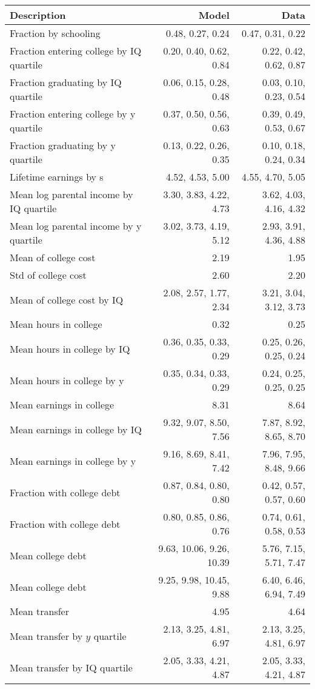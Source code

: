 \begin{tabular}{lrr}
\hline
Description & Model  & Data  \\
\hline
Fraction by schooling & 0.48, 0.27, 0.24  & 0.47, 0.31, 0.22  \\
Fraction entering college by IQ quartile & 0.20, 0.40, 0.62, 0.84  & 0.22, 0.42, 0.62, 0.87  \\
Fraction graduating by IQ quartile & 0.06, 0.15, 0.28, 0.48  & 0.03, 0.10, 0.23, 0.54  \\
Fraction entering college by y quartile & 0.37, 0.50, 0.56, 0.63  & 0.39, 0.49, 0.53, 0.67  \\
Fraction graduating by y quartile & 0.13, 0.22, 0.26, 0.35  & 0.10, 0.18, 0.24, 0.34  \\
Lifetime earnings by s & 4.52, 4.53, 5.00  & 4.55, 4.70, 5.05  \\
Mean log parental income by IQ quartile & 3.30, 3.83, 4.22, 4.73  & 3.62, 4.03, 4.16, 4.32  \\
Mean log parental income by y quartile & 3.02, 3.73, 4.19, 5.12  & 2.93, 3.91, 4.36, 4.88  \\
Mean of college cost & 2.19  & 1.95  \\
Std of college cost & 2.60  & 2.20  \\
Mean of college cost by IQ & 2.08, 2.57, 1.77, 2.34  & 3.21, 3.04, 3.12, 3.73  \\
Mean hours in college & 0.32  & 0.25  \\
Mean hours in college by IQ & 0.36, 0.35, 0.33, 0.29  & 0.25, 0.26, 0.25, 0.24  \\
Mean hours in college by y & 0.35, 0.34, 0.33, 0.29  & 0.24, 0.25, 0.25, 0.25  \\
Mean earnings in college & 8.31  & 8.64  \\
Mean earnings in college by IQ & 9.32, 9.07, 8.50, 7.56  & 7.87, 8.92, 8.65, 8.70  \\
Mean earnings in college by y & 9.16, 8.69, 8.41, 7.42  & 7.96, 7.95, 8.48, 9.66  \\
Fraction with college debt & 0.87, 0.84, 0.80, 0.80  & 0.42, 0.57, 0.57, 0.60  \\
Fraction with college debt & 0.80, 0.85, 0.86, 0.76  & 0.74, 0.61, 0.58, 0.53  \\
Mean college debt & 9.63, 10.06, 9.26, 10.39  & 5.76, 7.15, 5.71, 7.47  \\
Mean college debt & 9.25, 9.98, 10.45, 9.88  & 6.40, 6.46, 6.94, 7.49  \\
Mean transfer & 4.95  & 4.64  \\
Mean transfer by $y$ quartile & 2.13, 3.25, 4.81, 6.97  & 2.13, 3.25, 4.81, 6.97  \\
Mean transfer by IQ quartile & 2.05, 3.33, 4.21, 4.87  & 2.05, 3.33, 4.21, 4.87  \\
\hline
\end{tabular}%
